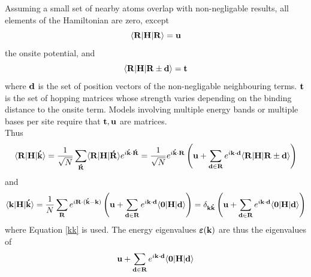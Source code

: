 \documentclass[a4paper, 12pt]{article}
\begin{document}
		Assuming a small set of nearby atoms overlap with non-negligable results, all elements of the Hamiltonian are zero, except
		\begin{equation}\label{u}
			\langle{\bf R}|{\bf H}|{\bf R}\rangle = \bf u
		\end{equation}
		the onsite potential, and 
		\begin{equation}\label{t}
			\langle{\bf R}|{\bf H}|{\bf R}\pm {\bf d}\rangle = \bf t
		\end{equation}
		where $\bf d$ is the set of position vectors of the non-negligable neighbouring terms. $\bf t$ is the set of hopping matrices whose strength varies depending on the binding distance to the onsite term. Models involving multiple energy bands or multiple bases per site require that $\bf t, u$ are matrices. 
		\\[2mm]Thus
		\begin{equation}
			\langle{\bf R}|{\bf H}|{\bf \acute{k}}\rangle = \frac{1}{\sqrt{N}}\sum_{\bf \acute{R}}\langle{\bf {R}}|{\bf H}|{\bf \acute{R}}\rangle e^{i\bf \acute{k}\cdot \acute{R}}= \frac{1}{\sqrt{N}}e^{i\bf \acute{k}\cdot R}\left({\bf u}+\sum_{{\bf d }\in {\bf R}}e^{i{\bf k \cdot d}}\langle{\bf R}|{\bf H}|{\bf R}\pm {\bf d}\rangle\right)
		\end{equation}
		and
		\begin{equation}\label{sumtb}
			\langle{\bf k}|{\bf H}|{\bf \acute{k}}\rangle = \frac{1}{N}\sum_{\bf R} e^{i\bf R\cdot (\acute{k}-k)}\left( {\bf u} + \sum_{{\bf d}\in {\bf R}}e^{i{\bf k \cdot d}}\langle\bf 0|H|d\rangle\right) = \delta_{\bf k \acute{k}}\left( {\bf u} + \sum_{{\bf d}\in {\bf R}}e^{i{\bf k \cdot d}}\langle\bf 0|H|d\rangle\right)
		\end{equation}
		where Equation \eqref{kk} is used.
		The energy eigenvalues $\bm\varepsilon({\bf k})$ are thus the eigenvalues of
		\begin{equation}
			{\bf u} + \sum_{{\bf d}\in {\bf R}}e^{i{\bf k \cdot d}}\langle\bf 0|H|d\rangle
			\label{tight}
		\end{equation}
\end{document}
